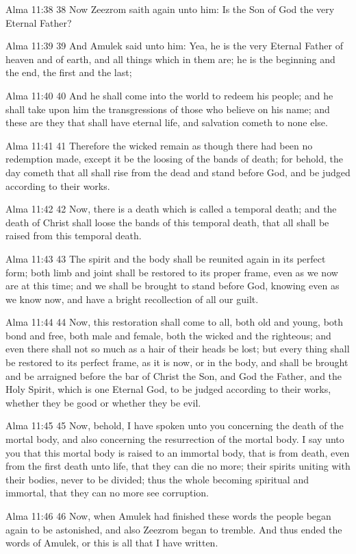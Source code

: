 Alma 11:38
 38 Now Zeezrom saith again unto him: Is the Son of God the very
Eternal Father?

Alma 11:39
 39 And Amulek said unto him: Yea, he is the very Eternal Father
of heaven and of earth, and all things which in them are; he is
the beginning and the end, the first and the last;

Alma 11:40
 40 And he shall come into the world to redeem his people; and he
shall take upon him the transgressions of those who believe on
his name; and these are they that shall have eternal life, and
salvation cometh to none else.

Alma 11:41
 41 Therefore the wicked remain as though there had been no
redemption made, except it be the loosing of the bands of death;
for behold, the day cometh that all shall rise from the dead and
stand before God, and be judged according to their works.

Alma 11:42
 42 Now, there is a death which is called a temporal death; and
the death of Christ shall loose the bands of this temporal death,
that all shall be raised from this temporal death.

Alma 11:43
 43 The spirit and the body shall be reunited again in its
perfect form; both limb and joint shall be restored to its proper
frame, even as we now are at this time; and we shall be brought
to stand before God, knowing even as we know now, and have a
bright recollection of all our guilt.

Alma 11:44
 44 Now, this restoration shall come to all, both old and young,
both bond and free, both male and female, both the wicked and the
righteous; and even there shall not so much as a hair of their
heads be lost; but every thing shall be restored to its perfect
frame, as it is now, or in the body, and shall be brought and be
arraigned before the bar of Christ the Son, and God the Father,
and the Holy Spirit, which is one Eternal God, to be judged
according to their works, whether they be good or whether they be
evil.

Alma 11:45
 45 Now, behold, I have spoken unto you concerning the death of
the mortal body, and also concerning the resurrection of the
mortal body. I say unto you that this mortal body is raised to
an immortal body, that is from death, even from the first death
unto life, that they can die no more; their spirits uniting with
their bodies, never to be divided; thus the whole becoming
spiritual and immortal, that they can no more see corruption.

Alma 11:46
 46 Now, when Amulek had finished these words the people began
again to be astonished, and also Zeezrom began to tremble. And
thus ended the words of Amulek, or this is all that I have
written.

